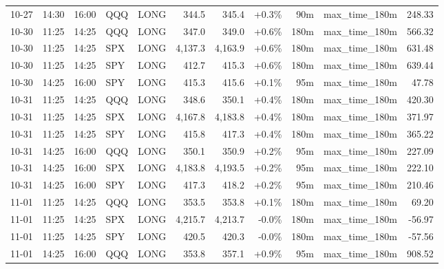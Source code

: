 \documentclass[11pt,a4paper,twoside]{article}
\begin{document}
\begin{center}
\begin{longtable}{>{\color{txtmain}}l l l l l r r r r >{\color{txtmain}}l r}
10-27 & 14:30 & 16:00 & QQQ & LONG & 344.5 & 345.4 & \textcolor{wingreen}{+0.3\%} & 90m & max\_time\_180m & \textcolor{wingreen}{248.33} \\
10-30 & 11:25 & 14:25 & QQQ & LONG & 347.0 & 349.0 & \textcolor{wingreen}{+0.6\%} & 180m & max\_time\_180m & \textcolor{wingreen}{566.32} \\
10-30 & 11:25 & 14:25 & SPX & LONG & 4,137.3 & 4,163.9 & \textcolor{wingreen}{+0.6\%} & 180m & max\_time\_180m & \textcolor{wingreen}{631.48} \\
10-30 & 11:25 & 14:25 & SPY & LONG & 412.7 & 415.3 & \textcolor{wingreen}{+0.6\%} & 180m & max\_time\_180m & \textcolor{wingreen}{639.44} \\
10-30 & 14:25 & 16:00 & SPY & LONG & 415.3 & 415.6 & \textcolor{wingreen}{+0.1\%} & 95m & max\_time\_180m & \textcolor{wingreen}{47.78} \\
10-31 & 11:25 & 14:25 & QQQ & LONG & 348.6 & 350.1 & \textcolor{wingreen}{+0.4\%} & 180m & max\_time\_180m & \textcolor{wingreen}{420.30} \\
10-31 & 11:25 & 14:25 & SPX & LONG & 4,167.8 & 4,183.8 & \textcolor{wingreen}{+0.4\%} & 180m & max\_time\_180m & \textcolor{wingreen}{371.97} \\
10-31 & 11:25 & 14:25 & SPY & LONG & 415.8 & 417.3 & \textcolor{wingreen}{+0.4\%} & 180m & max\_time\_180m & \textcolor{wingreen}{365.22} \\
10-31 & 14:25 & 16:00 & QQQ & LONG & 350.1 & 350.9 & \textcolor{wingreen}{+0.2\%} & 95m & max\_time\_180m & \textcolor{wingreen}{227.09} \\
10-31 & 14:25 & 16:00 & SPX & LONG & 4,183.8 & 4,193.5 & \textcolor{wingreen}{+0.2\%} & 95m & max\_time\_180m & \textcolor{wingreen}{222.10} \\
10-31 & 14:25 & 16:00 & SPY & LONG & 417.3 & 418.2 & \textcolor{wingreen}{+0.2\%} & 95m & max\_time\_180m & \textcolor{wingreen}{210.46} \\
11-01 & 11:25 & 14:25 & QQQ & LONG & 353.5 & 353.8 & \textcolor{wingreen}{+0.1\%} & 180m & max\_time\_180m & \textcolor{wingreen}{69.20} \\
11-01 & 11:25 & 14:25 & SPX & LONG & 4,215.7 & 4,213.7 & \textcolor{lossred}{-0.0\%} & 180m & max\_time\_180m & \textcolor{lossred}{-56.97} \\
11-01 & 11:25 & 14:25 & SPY & LONG & 420.5 & 420.3 & \textcolor{lossred}{-0.0\%} & 180m & max\_time\_180m & \textcolor{lossred}{-57.56} \\
11-01 & 14:25 & 16:00 & QQQ & LONG & 353.8 & 357.1 & \textcolor{wingreen}{+0.9\%} & 95m & max\_time\_180m & \textcolor{wingreen}{908.52} \\

\end{longtable}
\end{center}
\end{document}
